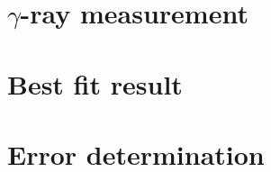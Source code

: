 \section{$\gamma$-ray measurement}


\subsection{}

\section{Best fit result}


\section{Error determination}

